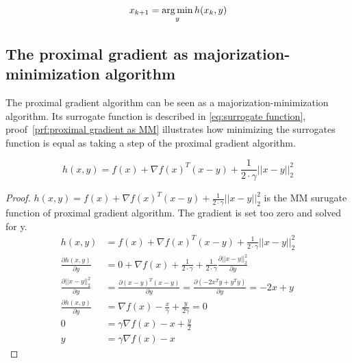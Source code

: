 	\begin{equation}
		x_{k+1} = \operatorname*{arg\,min}_y h(x_k,y)
		\label{eq:MM algorithm formula step}
	\end{equation}

	\subsection{The proximal gradient as majorization-minimization algorithm}
	The proximal gradient algorithm can be seen as a majorization-minimization algorithm. Its surrogate function is described in \eqref{eq:surrogate function}, proof~\ref{prf:proximal gradient as MM} illustrates how minimizing the surrogates function is equal as taking a step of the proximal gradient algorithm.
	
	\begin{equation}
		h(x,y) = f(x) + \nabla f(x)^T(x-y) + \frac{1}{2 \cdot \gamma}||x-y||^2_2
		\label{eq:surrogate function}
	\end{equation}
	
	\begin{proof}
		$h(x,y) = f(x) + \nabla f(x)^T(x-y) + \frac{1}{2 \cdot \gamma}||x-y||^2_2$ is the MM surugate function of proximal gradient algorithm. The gradient is set too zero and solved for y.
		\begin{align*}
		h(x,y)
		& = f(x) + \nabla f(x)^T(x-y) + \frac{1}{2 \cdot \gamma}||x-y||^2_2 \\
		\frac{\partial h(x,y)}{\partial y}
		& = 0 + \nabla f(x) + \frac{1}{2 \cdot \gamma} + \frac{1}{2 \cdot \gamma}\frac{\partial ||x-y||^2_2}{\partial y}  \\	
		\frac{\partial ||x-y||^2_2}{\partial y}
		& = \frac{\partial(x-y)^T(x-y)}{\partial y} = \frac{\partial(-2x^Ty + y^Ty)}{\partial y} = -2x+y \\
		\frac{\partial h(x,y)}{\partial y}
		& = \nabla f(x) - \frac{x}{\gamma} + \frac{y}{2 \gamma} = 0 \\
		0
		& = \gamma \nabla f(x) - x + \frac{y}{2} \\
		y & = \gamma \nabla f(x) - x
		\end{align*}
		\label{prf:proximal gradient as MM}
	\end{proof}